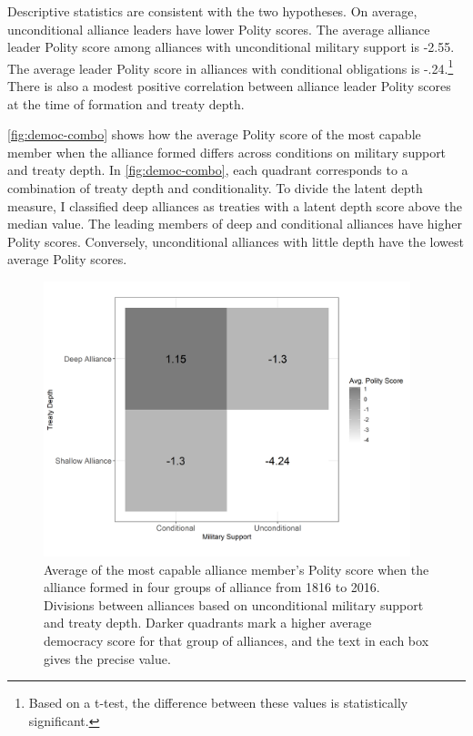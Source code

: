 \documentclass[12pt]{article}
\begin{document}
Descriptive statistics are consistent with the two hypotheses.
On average, unconditional alliance leaders have lower Polity scores.
The average alliance leader Polity score among alliances with unconditional military support is -2.55. 
The average leader Polity score in alliances with conditional obligations is -.24.\footnote{Based on a t-test, the difference between these values is statistically significant.} 
There is also a modest positive correlation between alliance leader Polity scores at the time of formation and treaty depth. 


\autoref{fig:democ-combo} shows how the average Polity score of the most capable member when the alliance formed differs across conditions on military support and treaty depth.
In \autoref{fig:democ-combo}, each quadrant corresponds to a combination of treaty depth and conditionality. 
To divide the latent depth measure, I classified deep alliances as treaties with a latent depth score above the median value. 
The leading members of deep and conditional alliances have higher Polity scores. 
Conversely, unconditional alliances with little depth have the lowest average Polity scores. 


\begin{figure}[hbtp]
\centering
\includegraphics[width=0.95\textwidth]{../figures/democ-combo.png}
\caption{Average of the most capable alliance member's Polity score when the alliance formed in four groups of alliance from 1816 to 2016. Divisions between alliances based on unconditional military support and treaty depth. Darker quadrants mark a higher average democracy score for that group of alliances, and the text in each box gives the precise value.}
\label{fig:democ-combo}
\end{figure}
\end{document}
